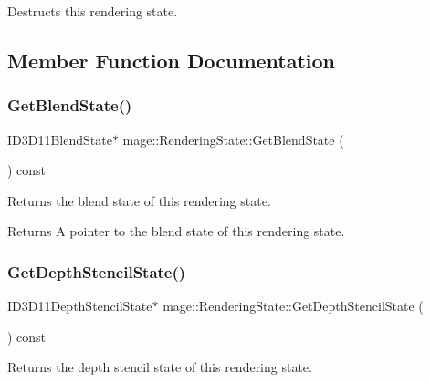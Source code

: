 Destructs this rendering state. 

\subsection{Member Function Documentation}
\hypertarget{structmage_1_1_rendering_state_ac1a0e8f7ba3865eaf0ec8445664a6a43}{}\label{structmage_1_1_rendering_state_ac1a0e8f7ba3865eaf0ec8445664a6a43} 
\subsubsection{\texorpdfstring{Get\+Blend\+State()}{GetBlendState()}}
{\footnotesize\ttfamily I\+D3\+D11\+Blend\+State$\ast$ mage\+::\+Rendering\+State\+::\+Get\+Blend\+State (\begin{DoxyParamCaption}{ }\end{DoxyParamCaption}) const\hspace{0.3cm}{\ttfamily [noexcept]}}

Returns the blend state of this rendering state.

\begin{DoxyReturn}{Returns}
A pointer to the blend state of this rendering state. 
\end{DoxyReturn}
\hypertarget{structmage_1_1_rendering_state_a8a11db948fdf3c84bf55346877fcc020}{}\label{structmage_1_1_rendering_state_a8a11db948fdf3c84bf55346877fcc020} 
\subsubsection{\texorpdfstring{Get\+Depth\+Stencil\+State()}{GetDepthStencilState()}}
{\footnotesize\ttfamily I\+D3\+D11\+Depth\+Stencil\+State$\ast$ mage\+::\+Rendering\+State\+::\+Get\+Depth\+Stencil\+State (\begin{DoxyParamCaption}{ }\end{DoxyParamCaption}) const\hspace{0.3cm}{\ttfamily [noexcept]}}

Returns the depth stencil state of this rendering state.

